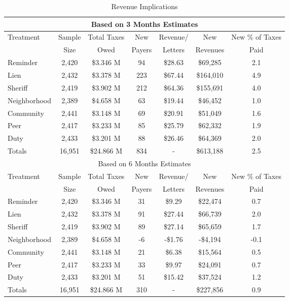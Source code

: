 \documentclass[12pt]{article}
\begin{document}
\begin{table}[htbp]
\centering
\caption{Revenue Implications}\label{rev}
\begin{tabular}{lcccccc}
  \hline
\multicolumn{7}{c}{Based on 3 Months Estimates} \\
\hline
Treatment & Sample & Total Taxes & New & Revenue/ & New & New \% of Taxes \\
 & Size & Owed & Payers & Letters & Revenues & Paid \\
  \hline
Reminder & 2,420 & \$3.346 M & 94 & \$28.63 & \$69,285 & 2.1 \\
  Lien & 2,432 & \$3.378 M & 223 & \$67.44 & \$164,010 & 4.9 \\
  Sheriff & 2,419 & \$3.902 M & 212 & \$64.36 & \$155,691 & 4.0 \\
  Neighborhood & 2,389 & \$4.658 M & 63 & \$19.44 & \$46,452 & 1.0 \\
  Community & 2,441 & \$3.148 M & 69 & \$20.91 & \$51,049 & 1.6 \\
  Peer & 2,417 & \$3.233 M & 85 & \$25.79 & \$62,332 & 1.9 \\
  Duty & 2,433 & \$3.201 M & 88 & \$26.46 & \$64,369 & 2.0 \\
   \hline
Totals & 16,951 & \$24.866 M & 834 & - & \$613,188 & 2.5 \\
   \hline
\multicolumn{7}{c}{Based on 6 Months Estimates} \\
\hline
Treatment & Sample & Total Taxes & New & Revenue/ & New & New \% of Taxes \\
 & Size & Owed & Payers & Letters & Revenues & Paid \\
\hline
Reminder & 2,420 & \$3.346 M & 31 & \$9.29 & \$22,474 & 0.7 \\
  Lien & 2,432 & \$3.378 M & 91 & \$27.44 & \$66,739 & 2.0 \\
  Sheriff & 2,419 & \$3.902 M & 89 & \$27.14 & \$65,659 & 1.7 \\
  Neighborhood & 2,389 & \$4.658 M & -6 & -\$1.76 & -\$4,194 & -0.1 \\
  Community & 2,441 & \$3.148 M & 21 & \$6.38 & \$15,564 & 0.5 \\
  Peer & 2,417 & \$3.233 M & 33 & \$9.97 & \$24,091 & 0.7 \\
  Duty & 2,433 & \$3.201 M & 51 & \$15.42 & \$37,524 & 1.2 \\
  Totals & 16,951 & \$24.866 M & 310 & - & \$227,856 & 0.9 \\

\end{tabular}
\end{table}
\end{document}
